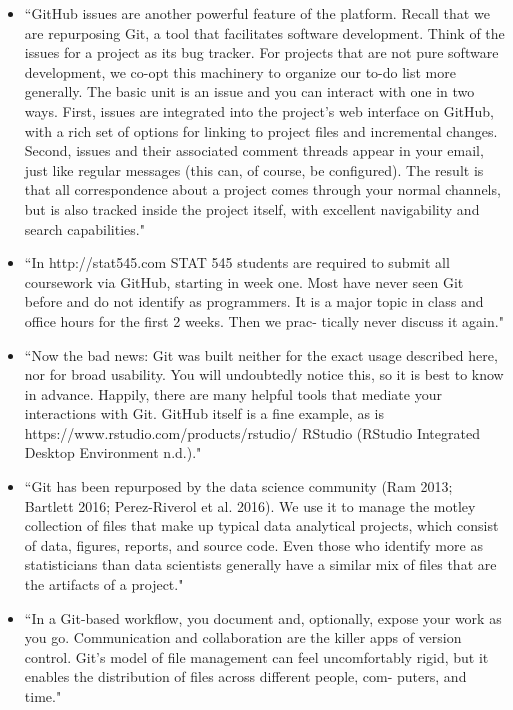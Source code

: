 \documentclass[pdftex,english,11pt,parskip=half]{scrartcl}
\begin{document}
\begin{itemize}
\item ``GitHub issues are another powerful feature of the platform. Recall that we are repurposing Git, a tool that facilitates software development. Think of the issues for a project as its bug tracker. For projects that are not pure software development, we co-opt this machinery to organize our to-do list more generally. The basic unit is an issue and you can interact with one in two ways. First, issues are integrated into the project’s web interface on GitHub, with a rich set of options for linking to project files and incremental changes. Second, issues and their associated comment threads appear in your email, just like regular messages (this can, of course, be configured). The result is that all correspondence about a project comes through your normal channels, but is also tracked inside the project itself, with excellent navigability and search capabilities." \cite{bryan2018excuse} 
\item ``In http://stat545.com STAT 545 students are required to submit all coursework via GitHub, starting in week one. Most have never seen Git before and do not identify as programmers. It is a major topic in class and office hours for the first 2 weeks. Then we prac- tically never discuss it again." \cite{bryan2018excuse}
\item ``Now the bad news: Git was built neither for the exact usage described here, nor for broad usability. You will undoubtedly notice this, so it is best to know in advance. Happily, there are many helpful tools that mediate your interactions with Git. GitHub itself is a fine example, as is https://www.rstudio.com/products/rstudio/ RStudio (RStudio Integrated Desktop Environment n.d.)." \cite{bryan2018excuse} 
\item ``Git has been repurposed by the data science community (Ram 2013; Bartlett 2016; Perez-Riverol et al. 2016). We use it to manage the motley collection of files that make up typical data analytical projects, which consist of data, figures, reports, and source code. Even those who identify more as statisticians than data scientists generally have a similar mix of files that are the artifacts of a project." \cite{bryan2018excuse} 
\item ``In a Git-based workflow, you document and, optionally, expose your work as you go. Communication and collaboration are the killer apps of version control. Git’s model of file management can feel uncomfortably rigid, but it enables the distribution of files across different people, com- puters, and time." \cite{bryan2018excuse}

\end{itemize}
\end{document}

